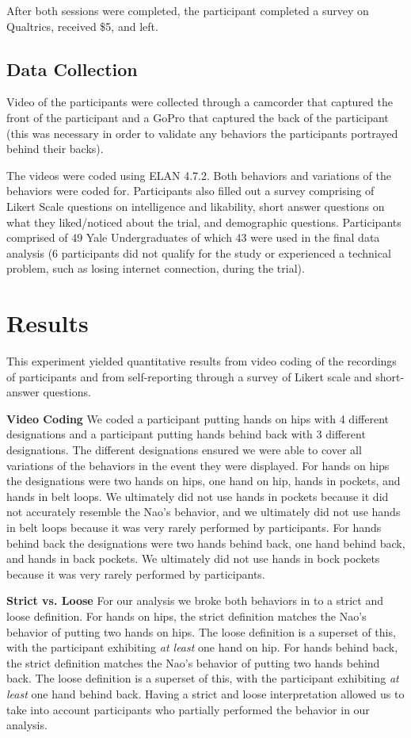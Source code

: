\documentclass{acm_proc_article-sp}
\begin{document}
After both sessions were completed, the participant completed a survey on Qualtrics, received \$5, and left.

\subsection{Data Collection}
Video of the participants were collected through a camcorder that captured the front of the participant and a GoPro that captured the back of the participant (this was necessary in order to validate any behaviors the participants portrayed behind their backs).

The videos were coded using ELAN 4.7.2. Both behaviors and variations of the behaviors were coded for. Participants also filled out a survey comprising of Likert Scale questions on intelligence and likability, short answer questions on what they liked/noticed about the trial, and demographic questions. Participants comprised of 49 Yale Undergraduates of which 43 were used in the final data analysis (6 participants did not qualify for the study or experienced a technical problem, such as losing internet connection, during the trial).

\section{Results}
This experiment yielded quantitative results from video coding of the recordings of participants and from self-reporting through a survey of Likert scale and short-answer questions. 

\textbf{Video Coding} We coded a participant putting hands on hips with 4 different designations and a participant putting hands behind back with 3 different designations. The different designations ensured we were able to cover all variations of the behaviors in the event they were displayed. For hands on hips the designations were two hands on hips, one hand on hip, hands in pockets, and hands in belt loops. We ultimately did not use hands in pockets because it did not accurately resemble the Nao's behavior, and we ultimately did not use hands in belt loops because it was very rarely performed by participants. For hands behind back the designations were two hands behind back, one hand behind back, and hands in back pockets. We ultimately did not use hands in bock pockets because it was very rarely performed by participants.
	
\textbf{Strict vs. Loose} For our analysis we broke both behaviors in to a strict and loose definition. For hands on hips, the strict definition matches the Nao's behavior of putting two hands on hips. The loose definition is a superset of this, with the participant exhibiting \textit{at least} one hand on hip. For hands behind back, the strict definition matches the Nao's behavior of putting two hands behind back. The loose definition is a superset of this, with the participant exhibiting \textit{at least} one hand behind back. Having a strict and loose interpretation allowed us to take into account participants who partially performed the behavior in our analysis. 
\end{document}
